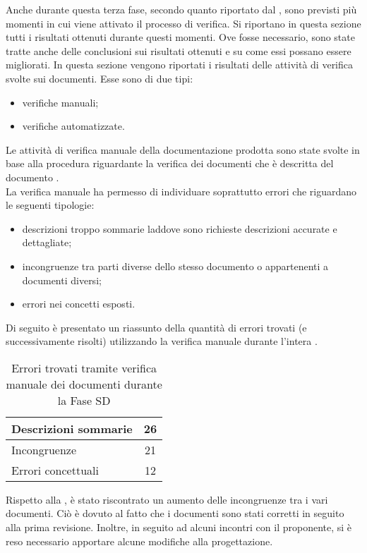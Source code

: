 \label{app:esitiSD}
Anche durante questa terza fase, secondo quanto riportato dal , sono previsti più momenti in cui viene attivato il processo di verifica. Si riportano in questa sezione tutti i risultati ottenuti durante questi momenti. Ove fosse necessario, sono state tratte anche delle conclusioni sui risultati ottenuti e su come essi possano essere migliorati.
			In questa sezione vengono riportati i risultati delle attività di verifica svolte sui documenti. Esse sono di due tipi:
			\begin{itemize}
				\item verifiche manuali;
				\item verifiche automatizzate.
			\end{itemize}
				Le attività di verifica manuale della documentazione prodotta sono state svolte in base alla procedura riguardante la verifica dei 
				documenti che è descritta del documento .\\
				La verifica manuale ha permesso di individuare soprattutto errori che riguardano le seguenti tipologie:
				\begin{itemize}
					\item descrizioni troppo sommarie laddove sono richieste descrizioni accurate e dettagliate;
					\item incongruenze tra parti diverse dello stesso documento o appartenenti a documenti diversi;
					\item errori nei concetti esposti.
				\end{itemize}
				Di seguito è presentato un riassunto della quantità di errori trovati (e successivamente risolti) utilizzando la verifica manuale durante l'intera .
				\begin{table}[H]
					\centering
					\begin{tabu}{| l | c |}
						\hline
						Descrizioni sommarie	&	26\\ \hline
						Incongruenze	&	21\\ \hline
						Errori concettuali	&	12\\ \hline
					\end{tabu}
					\caption{Errori trovati tramite verifica manuale dei documenti durante la Fase SD}
				\end{table}
				Rispetto alla , è stato riscontrato un aumento delle incongruenze tra i vari documenti. Ciò è dovuto al fatto che i documenti sono stati corretti in seguito alla prima revisione. Inoltre, in seguito ad alcuni incontri con il proponente, si è reso necessario apportare alcune modifiche alla progettazione.\\
